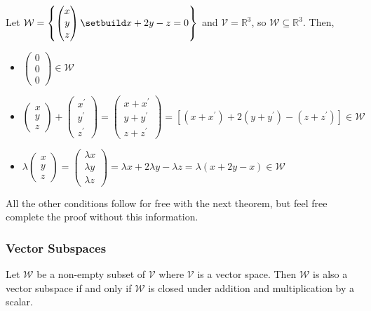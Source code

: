 \begin{exm}\label{exm-vector-subspace}
	Let $\mathcal{W}=\left\{\begin{pmatrix}x\\y\\z\end{pmatrix}\setbuild x+2y-z=0\right\}$
	and $\mathcal{V}=\mathbb{R}^3$, so $\mathcal{W}\subseteq\mathbb{R}^3$. Then,
	\begin{itemize}
		\item $\begin{pmatrix}0\\0\\0\end{pmatrix}\in\mathcal{W}$
		\item $\begin{pmatrix}x\\y\\z\end{pmatrix}+\begin{pmatrix}x^\prime\\y^\prime\\z^\prime\end{pmatrix}=\begin{pmatrix}x+x^\prime\\y+y^\prime\\z+z^\prime\end{pmatrix}=[(x+x^\prime)+2(y+y^\prime)-(z+z^\prime)]\in\mathcal{W}$
		\item $\lambda\begin{pmatrix}x\\y\\z\end{pmatrix}=\begin{pmatrix}\lambda x\\ \lambda y\\ \lambda z\end{pmatrix}=\lambda x + 2 \lambda y - \lambda z = \lambda(x+2y-x)\in\mathcal{W}$
	\end{itemize}
	All the other conditions follow for free with the next theorem, but feel free
	complete the proof without this information.
\end{exm}

\subsubsection{Vector Subspaces}\label{subsubsec-vector-subspaces}

\begin{thm}\label{thm-supspace}
	Let $\mathcal{W}$ be a non-empty subset of $\mathcal{V}$ where $\mathcal{V}$
	is a vector space. Then $\mathcal{W}$ is also a vector subspace if and only
	if $\mathcal{W}$ is closed under addition and multiplication by a scalar.
\end{thm}

